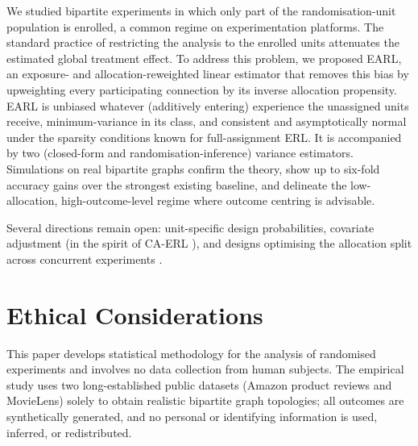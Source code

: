 \documentclass[sigconf,anonymous,review]{acmart}
\begin{document}
We studied bipartite experiments in which only part of the randomisation-unit population is enrolled, a common regime on experimentation platforms. The standard practice of restricting the analysis to the enrolled units attenuates the estimated global treatment effect. To address this problem, we proposed EARL, an exposure- and allocation-reweighted linear estimator that removes this bias by upweighting every participating connection by its inverse allocation propensity. EARL is unbiased whatever (additively entering) experience the unassigned units receive, minimum-variance in its class, and consistent and asymptotically normal under the sparsity conditions known for full-assignment ERL. It is accompanied by two (closed-form and randomisation-inference) variance estimators. Simulations on real bipartite graphs confirm the theory, show up to six-fold accuracy gains over the strongest existing baseline, and delineate the low-allocation, high-outcome-level regime where outcome centring is advisable.

Several directions remain open: unit-specific design probabilities, covariate adjustment (in the spirit of CA-ERL \cite{shi2025scalableanalysisbipartiteexperiments}), and designs optimising the allocation split across concurrent experiments \cite{harshaw2023erl,brennan2022cluster}.


\section*{Ethical Considerations}
This paper develops statistical methodology for the analysis of randomised experiments and involves no data collection from human subjects. The empirical study uses two long-established public datasets (Amazon product reviews and MovieLens) solely to obtain realistic bipartite graph topologies; all outcomes are synthetically generated, and no personal or identifying information is used, inferred, or redistributed.
\end{document}
